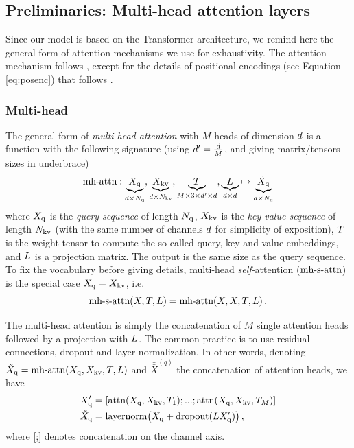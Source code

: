 \subsection{Preliminaries: Multi-head attention layers}
\label{sec:mha} 

Since our model is based on the Transformer architecture, we remind here the general form of attention mechanisms we use for exhaustivity. The attention mechanism follows \cite{Vaswani2017AttentionIA}, except for the details of positional encodings (see Equation \ref{eq:posenc}) that follows \cite{Cordonnier2019OnTR}.

\subsubsection{Multi-head} The general form of \emph{multi-head attention} with $M$ heads of dimension $d$ is a function with the following signature (using  $d' = \frac{d}{M}$, and giving matrix/tensors sizes in underbrace)
\begin{equation}
    \text{\rm mh-attn}:\underbrace{X_{\rm q}}_{d\times N_{\rm q}}, \underbrace{X_{\rm kv}}_{d\times N_{\rm kv}}, \underbrace{T}_{M\times 3\times d' \times d}, \underbrace{L}_{d\times d} \mapsto \underbrace{\tilde{X}_{\rm q}}_{d\times N_{\rm q}}
\end{equation}
where $X_{\rm q}$ is the \emph{query sequence} of length $N_{\rm q}$, $X_{\rm kv}$ is the \emph{key-value sequence} of length $N_{\rm kv}$ (with the same number of channels $d$ for simplicity of exposition), $T$ is the weight tensor to compute the so-called query, key and value embeddings, and $L$ is a projection matrix. The output is the same size as the query sequence. To fix the vocabulary before giving details, multi-head \emph{self-}attention ($\text{\rm mh-s-attn}$) is the special case $X_{\rm q} = X_{\rm kv}$, i.e. 
\begin{equation}
    \text{\rm mh-s-attn}(X, T, L) = \text{\rm mh-attn}(X, X, T,L)\,.\label{eq:selfatt}
\end{equation}

The multi-head attention is simply the concatenation of $M$ single attention heads followed by a projection with $L$. The common practice \cite{Vaswani2017AttentionIA} is to use residual connections, dropout and layer normalization. In other words, denoting $\tilde{X}_{\rm q} = \text{\rm mh-attn}(X_{\rm q}, X_{\rm kv}, T, L)$ and $\bar{\bar{X}}^{(q)}$ the concatenation of attention heads, we have
\begin{align}
    X'_{\rm q}&= [\text{\rm attn}(X_{\rm q}, X_{\rm kv}, T_1) ; ... ; \text{\rm attn}(X_{\rm q}, X_{\rm kv}, T_M)]\\
    \tilde{X}_{\rm q} &= {\rm layernorm}\big(X_{\rm q} + {\rm dropout}(LX'_{\rm q})\big)\,,\label{eq:layernormresdropout}
\end{align}
where [;] denotes concatenation on the channel axis. 

